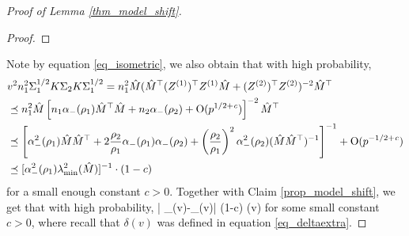 \begin{proof}[Proof of Lemma \ref{thm_model_shift}]
\begin{proof}
\end{proof}
Note by equation \eqref{eq_isometric}, we also obtain that with high probability,
\begin{align*}
&v^2 n_1^2 \Sigma_1^{1/2} K \Sigma_2 K \Sigma_1^{1/2} =n_1^2 \hat M (\hat M^\top (Z^{(1)})^{\top} Z^{(1)} \hat M + (Z^{(2)})^\top Z^{(2)})^{-2}\hat M^\top \\
&\preceq  n_1^2 \hat M \left[n_1 \alpha_-(\rho_1)\hat M^\top \hat M + n_2 \alpha_-(\rho_2) + \operatorname{O}(p^{1/2+{\mathit{c}}})\right]^{-2}\hat M^\top \\
&\preceq  \left[ \alpha_-^2(\rho_1) \hat M\hat M^\top + 2\frac{\rho_2}{\rho_1} \alpha_-(\rho_1)\alpha_-(\rho_2) + \left(\frac{\rho_2}{\rho_1}\right)^2 \alpha_-^2(\rho_2) (\hat M \hat M^\top )^{-1}\right]^{-1}+  \operatorname{O}(p^{-1/2+{\mathit{c}}}) \\
&\preceq [\alpha_-^2(\rho_1) \lambda_{\min}^2(\hat M)]^{-1}\cdot (1 - c)
\end{align*}
for a small enough constant $c>0$. Together with Claim \ref{prop_model_shift}, we get that with high probability,
\be\label{bounddelta-}
\left| \delta_{\bias}(v)-\wt\delta_{\bias}(v)\right|
		\le (1-c) \delta(v)
\ee
for some small constant $c>0$, where recall that $\delta(v)$ was defined in equation \eqref{eq_deltaextra}.



\end{proof}
